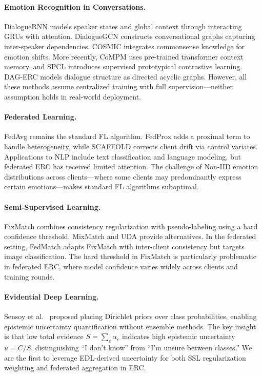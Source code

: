 \documentclass[letterpaper]{article}
\begin{document}
\paragraph{Emotion Recognition in Conversations.}
DialogueRNN \cite{majumder2019dialoguernn} models speaker states and global context
through interacting GRUs with attention. DialogueGCN \cite{ghosal2019dialoguegcn}
constructs conversational graphs capturing inter-speaker dependencies.
COSMIC \cite{ghosal2020cosmic} integrates commonsense knowledge for emotion shifts.
More recently, CoMPM \cite{lee2022compm} uses pre-trained transformer context
memory, and SPCL \cite{song2022spcl} introduces supervised prototypical contrastive
learning. DAG-ERC \cite{shen2021dagerc} models dialogue structure as directed
acyclic graphs. However, all these methods assume centralized training with
full supervision---neither assumption holds in real-world deployment.

\paragraph{Federated Learning.}
FedAvg \cite{mcmahan2017communication} remains the standard FL algorithm. FedProx
\cite{li2020fedprox} adds a proximal term to handle heterogeneity, while SCAFFOLD
\cite{karimireddy2020scaffold} corrects client drift via control variates.
Applications to NLP include text classification \cite{lin2021fednlp} and language
modeling, but federated ERC has received limited attention. The challenge of
Non-IID emotion distributions across clients---where some clients may
predominantly express certain emotions---makes standard FL algorithms suboptimal.

\paragraph{Semi-Supervised Learning.}
FixMatch \cite{sohn2020fixmatch} combines consistency regularization with
pseudo-labeling using a hard confidence threshold. MixMatch
\cite{berthelot2019mixmatch} and UDA \cite{xie2020unsupervised} provide
alternatives. In the federated setting, FedMatch \cite{jeong2021federated}
adapts FixMatch with inter-client consistency but targets image classification.
The hard threshold in FixMatch is particularly problematic in federated ERC,
where model confidence varies widely across clients and training rounds.

\paragraph{Evidential Deep Learning.}
Sensoy et al.~\cite{sensoy2018evidential} proposed placing Dirichlet priors over
class probabilities, enabling epistemic uncertainty quantification without ensemble
methods. The key insight is that low total evidence $S = \sum_c \alpha_c$ indicates
high epistemic uncertainty $u = C/S$, distinguishing ``I don't know'' from ``I'm
unsure between classes.'' We are the first to leverage EDL-derived uncertainty
for both SSL regularization weighting and federated aggregation in ERC.
\end{document}
